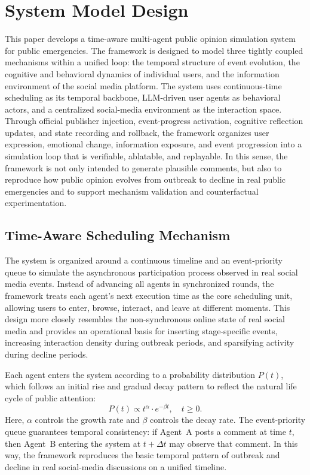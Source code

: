 \section{System Model Design}

This paper develops a time-aware multi-agent public opinion simulation system for public emergencies. The framework is designed to model three tightly coupled mechanisms within a unified loop: the temporal structure of event evolution, the cognitive and behavioral dynamics of individual users, and the information environment of the social media platform. The system uses continuous-time scheduling as its temporal backbone, LLM-driven user agents as behavioral actors, and a centralized social-media environment as the interaction space. Through official publisher injection, event-progress activation, cognitive reflection updates, and state recording and rollback, the framework organizes user expression, emotional change, information exposure, and event progression into a simulation loop that is verifiable, ablatable, and replayable. In this sense, the framework is not only intended to generate plausible comments, but also to reproduce how public opinion evolves from outbreak to decline in real public emergencies and to support mechanism validation and counterfactual experimentation.

\subsection{Time-Aware Scheduling Mechanism}

The system is organized around a continuous timeline and an event-priority queue to simulate the asynchronous participation process observed in real social media events. Instead of advancing all agents in synchronized rounds, the framework treats each agent's next execution time as the core scheduling unit, allowing users to enter, browse, interact, and leave at different moments. This design more closely resembles the non-synchronous online state of real social media and provides an operational basis for inserting stage-specific events, increasing interaction density during outbreak periods, and sparsifying activity during decline periods.

Each agent enters the system according to a probability distribution \(P(t)\), which follows an initial rise and gradual decay pattern to reflect the natural life cycle of public attention:
\[
P(t) \propto t^{\alpha} \cdot e^{-\beta t}, \quad t \ge 0.
\]
Here, \(\alpha\) controls the growth rate and \(\beta\) controls the decay rate. The event-priority queue guarantees temporal consistency: if Agent~A posts a comment at time \(t\), then Agent~B entering the system at \(t+\Delta t\) may observe that comment. In this way, the framework reproduces the basic temporal pattern of outbreak and decline in real social-media discussions on a unified timeline.

